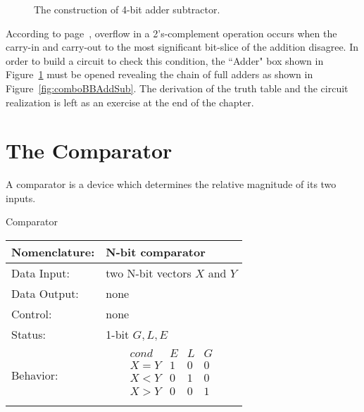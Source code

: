     \begin{figure}[ht]
        \caption{The construction of 4-bit adder subtractor.}
        \label{fig:comboBBTotalAddSub}
    \end{figure}
    \label{page:as}

    According to page~\pageref{page:Ovf}, overflow in a 2's-complement
    operation occurs when the carry-in and carry-out to the most
    significant bit-slice of the addition disagree.  In order to
    build a circuit to check this condition, the ``Adder" box shown in
    Figure~\ref{fig:comboBBTotalAddSub} must be opened revealing
    the chain of full adders as shown in Figure~\ref{fig:comboBBAddSub}.
    The derivation of the truth table and the circuit realization
    is left as an exercise at the end of the chapter.

\section{The Comparator}
    A comparator is a device which determines the relative magnitude
    of its two inputs.

    \begin{buildingblock}{Comparator}
        \label{buildingblock:comparator}

        \begin{tabular}{|l|p{3.5in}|} \hline
            Nomenclature:  & N-bit comparator                \\ \hline
            Data Input:    & two N-bit vectors $X$ and $Y$           \\ \hline
            Data Output:   & none               \\ \hline
            Control:       & none                      \\ \hline
            Status:        & 1-bit $G,L,E$ \\ \hline
            Behavior:      &
            $$
            \begin{array}{l|l|l|l}
                cond  & E & L & G \\ \hline
                X = Y & 1 & 0 & 0 \\ \hline
                X < Y & 0 & 1 & 0 \\ \hline
                X > Y & 0 & 0 & 1 \\
            \end{array}$$            \\ \hline
        \end{tabular}
        \label{page:com}
    \end{buildingblock}

